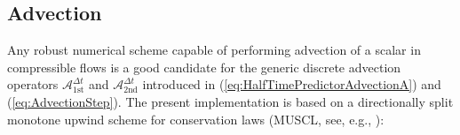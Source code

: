 \documentclass{ametsoc}
\theoremstyle{definition}
\newcommand{\eq}[1]{(\ref{#1})}
\newcommand{\dt}{\Delta t}
\begin{document}

\subsection{Advection}
\label{ssec:Advection}

Any robust numerical scheme capable of performing advection of a scalar in
compressible flows is a good candidate for the generic discrete
advection operators $\mathcal{A}_{\text{1st}}^{\dt}$ and 
$\mathcal{A}_{\text{2nd}}^{\dt}$ introduced in \eq{eq:HalfTimePredictorAdvectionA}
and \eq{eq:AdvectionStep}. 
The present implementation is based on a directionally split 
monotone upwind scheme for conservation laws (MUSCL, see, e.g.,
\citet{vanLeer2006}): 
\end{document}
